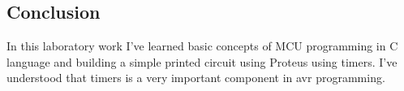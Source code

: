 \subsection*{Conclusion}
In this laboratory work I've learned basic concepts of MCU
programming in C language and building a simple printed circuit using Proteus using timers. I've understood that timers is a very important component in avr programming.



